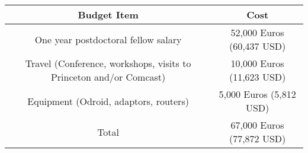 \documentclass[11 pt]{article}
\begin{document}
\begin{center}
 \begin{tabular}{||c c ||}
 \hline
 Budget Item & Cost \\ [0.5ex]
 \hline\hline
 One year postdoctoral fellow salary &  52,000 Euros (60,437 USD)\\
 \hline
 Travel (Conference, workshops, visits to Princeton and/or Comcast) & 10,000 Euros (11,623 USD)\\
 \hline
 Equipment (Odroid, adaptors, routers) & 5,000 Euros (5,812 USD)\\
 \hline
 Total & 67,000 Euros (77,872 USD)\\
 \hline
\end{tabular}
\end{center}
\end{document}
